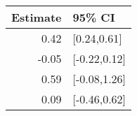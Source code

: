 \begin{tabular}{rl}
  \hline
Estimate & 95\% CI \\ 
  \hline
0.42 & [0.24,0.61] \\ 
  -0.05 & [-0.22,0.12] \\ 
  0.59 & [-0.08,1.26] \\ 
  0.09 & [-0.46,0.62] \\ 
   \hline
\end{tabular}

